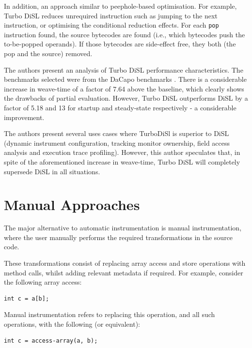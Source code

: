 		In addition, an approach similar to peephole-based optimisation. For example, Turbo DiSL reduces unrequired instruction such as jumping to the next instruction, or optimising the conditional reduction effects. For each \texttt{pop} instruction found, the source bytecodes are found (i.e., which bytecodes push the to-be-popped operands). If those bytecodes are side-effect free, they both (the pop and the source) removed.
		
		The authors present an analysis of Turbo DiSL performance characteristics. The benchmarks selected were from the DaCapo benchmarks \citep{Blackburn2006}. There is a considerable increase in weave-time of a factor of 7.64 above the baseline, which clearly shows the drawbacks of partial evaluation. However, Turbo DiSL outperforms DiSL by a factor of 5.18 and 13 for startup and steady-state respectively - a considerable improvement.

		The authors present several uses cases where TurboDiSl is superior to DiSL (dynamic instrument configuration, tracking monitor ownership, field access analysis and execution trace profiling). However, this author speculates that, in spite of the aforementioned increase in weave-time, Turbo DiSL will completely supersede DiSL in all situations. 
		
\section{Manual Approaches} \label{sec:instrumentation/manual}
The major alternative to automatic instrumentation is manual instrumentation, where the user manually performs the required transformations in the source code.

These transformations consist of replacing array access and store operations with method calls, whilst adding relevant metadata if required. For example, consider the following array access:

\begin{lstlisting}[label=list:array-access,caption=Standard array access in Java]
int c = a[b];\end{lstlisting}

Manual instrumentation refers to replacing this operation, and all such operations, with the following (or equivalent):

\begin{lstlisting}[label=list:instrumented-array-access,caption=Instrumented array access]
int c = access-array(a, b);\end{lstlisting}

